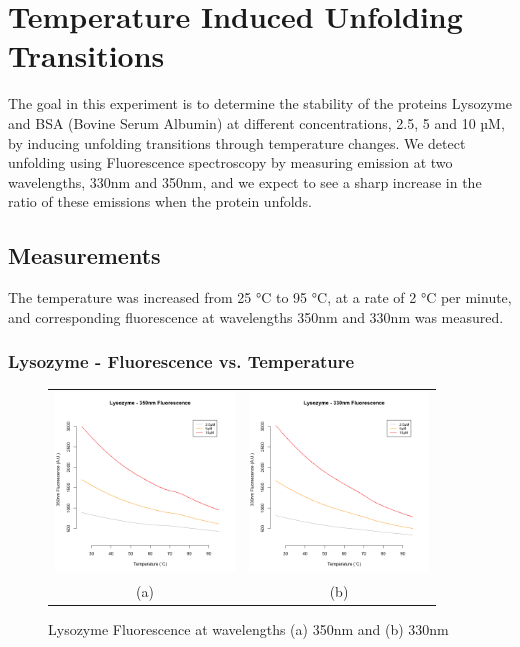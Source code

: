 \documentclass[a4paper,11pt]{article}
\begin{document}
    \section{Temperature Induced Unfolding Transitions}
        The goal in this experiment is to determine the stability of the proteins Lysozyme and BSA 
        (Bovine Serum Albumin) at different concentrations, 2.5, 5 and 10 µM, by inducing unfolding 
        transitions through temperature changes.
        We detect unfolding using Fluorescence spectroscopy by measuring emission at 
        two wavelengths, 330nm and 350nm, and we expect to see a sharp increase in the ratio
        of these emissions when the protein unfolds.

        \subsection*{Measurements}
            The temperature was increased from 25 °C to 95 °C, at a rate of 2 °C per minute,
            and corresponding fluorescence at wavelengths 350nm and 330nm was measured.

            \subsubsection*{Lysozyme - Fluorescence vs. Temperature}
                \begin{figure}[H]
                    \centering
                    \begin{tabular}{cc}
                        \includegraphics[width=180px]{../resources/unfolding_lys_350.png} &
                        \includegraphics[width=180px]{../resources/unfolding_lys_330.png} \\
                        (a) & (b)\\
                    \end{tabular}
                    \caption{Lysozyme Fluorescence at wavelengths (a) 350nm and (b) 330nm}\label{fig:lys_flr}
                \end{figure}
                
\end{document}
